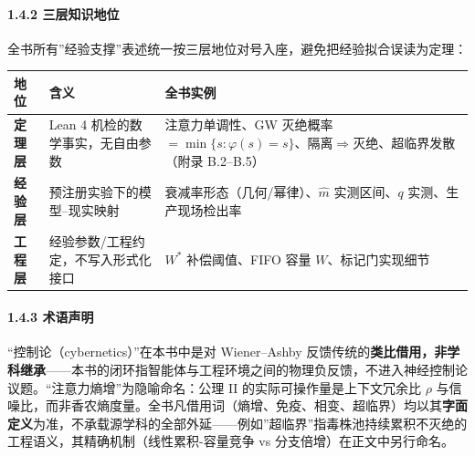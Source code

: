 \paragraph{1.4.2
三层知识地位}\label{ux4e09ux5c42ux77e5ux8bc6ux5730ux4f4d}

全书所有''经验支撑''表述统一按三层地位对号入座，避免把经验拟合误读为定理：

{\def\LTcaptype{} %
\begin{longtable}[]{@{}
  >{\raggedright\arraybackslash}p{}
  >{\raggedright\arraybackslash}p{}
  >{\raggedright\arraybackslash}p{}@{}}
\toprule\noalign{}
\begin{minipage}[b]{\linewidth}\raggedright
地位
\end{minipage} & \begin{minipage}[b]{\linewidth}\raggedright
含义
\end{minipage} & \begin{minipage}[b]{\linewidth}\raggedright
全书实例
\end{minipage} \\
\midrule\noalign{}
\endhead
\bottomrule\noalign{}
\endlastfoot
\textbf{定理层} & Lean 4 机检的数学事实，无自由参数 & 注意力单调性、GW
灭绝概率
\(=\min\{s:\varphi(s)=s\}\)、隔离\(\Rightarrow\)灭绝、超临界发散（附录
B.2--B.5） \\
\textbf{经验层} & 预注册实验下的模型--现实映射 &
衰减率形态（几何/幂律）、\(\hat m\) 实测区间、\(q\)
实测、生产现场检出率 \\
\textbf{工程层} & 经验参数/工程约定，不写入形式化接口 & \(W^*\)
补偿阈值、FIFO 容量 \(W\)、标记门实现细节 \\
\end{longtable}
}

\paragraph{1.4.3 术语声明}\label{ux672fux8bedux58f0ux660e}

``控制论（cybernetics）''在本书中是对 Wiener--Ashby
反馈传统的\textbf{类比借用，非学科继承}------本书的闭环指智能体与工程环境之间的物理负反馈，不进入神经控制论议题。``注意力熵增''为隐喻命名：公理
II 的实际可操作量是上下文冗余比 \(\rho\)
与信噪比，而非香农熵度量。全书凡借用词（熵增、免疫、相变、超临界）均以其\textbf{字面定义}为准，不承载源学科的全部外延------例如''超临界''指毒株池持续累积不灭绝的工程语义，其精确机制（线性累积-容量竞争
vs 分支倍增）在正文中另行命名。


